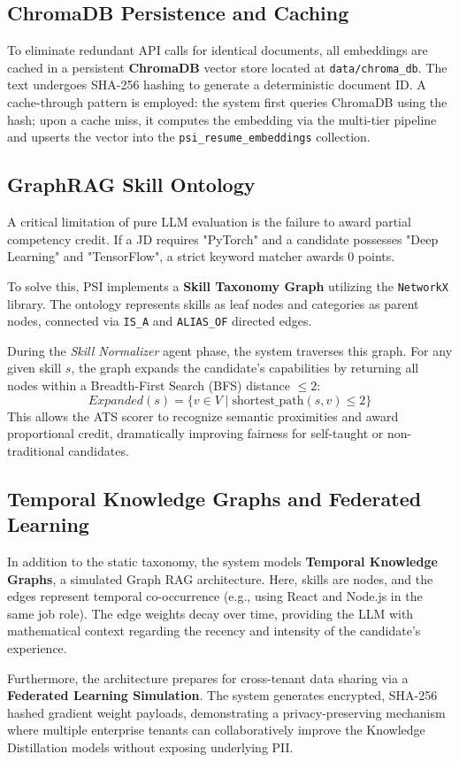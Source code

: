 \subsection{ChromaDB Persistence and Caching}
To eliminate redundant API calls for identical documents, all embeddings are cached in a persistent \textbf{ChromaDB} vector store located at \texttt{data/chroma\_db}. 
The text undergoes SHA-256 hashing to generate a deterministic document ID. A cache-through pattern is employed: the system first queries ChromaDB using the hash; upon a cache miss, it computes the embedding via the multi-tier pipeline and upserts the vector into the \texttt{psi\_resume\_embeddings} collection.

\subsection{GraphRAG Skill Ontology}
A critical limitation of pure LLM evaluation is the failure to award partial competency credit. If a JD requires "PyTorch" and a candidate possesses "Deep Learning" and "TensorFlow", a strict keyword matcher awards 0 points.

To solve this, PSI implements a \textbf{Skill Taxonomy Graph} utilizing the \texttt{NetworkX} library. The ontology represents skills as leaf nodes and categories as parent nodes, connected via \texttt{IS\_A} and \texttt{ALIAS\_OF} directed edges. 

During the \textit{Skill Normalizer} agent phase, the system traverses this graph. For any given skill $s$, the graph expands the candidate's capabilities by returning all nodes within a Breadth-First Search (BFS) distance $\leq 2$:
\begin{equation}
    Expanded(s) = \{v \in V \mid \text{shortest\_path}(s, v) \leq 2\}
\end{equation}
This allows the ATS scorer to recognize semantic proximities and award proportional credit, dramatically improving fairness for self-taught or non-traditional candidates.

\subsection{Temporal Knowledge Graphs and Federated Learning}
In addition to the static taxonomy, the system models \textbf{Temporal Knowledge Graphs}, a simulated Graph RAG architecture. Here, skills are nodes, and the edges represent temporal co-occurrence (e.g., using React and Node.js in the same job role). The edge weights decay over time, providing the LLM with mathematical context regarding the recency and intensity of the candidate's experience.

Furthermore, the architecture prepares for cross-tenant data sharing via a \textbf{Federated Learning Simulation}. The system generates encrypted, SHA-256 hashed gradient weight payloads, demonstrating a privacy-preserving mechanism where multiple enterprise tenants can collaboratively improve the Knowledge Distillation models without exposing underlying PII.
